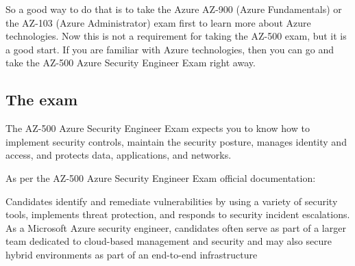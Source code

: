 So a good way to do that is to take the Azure AZ-900 (Azure Fundamentals) or the AZ-103 (Azure Administrator) exam first to learn more about Azure technologies. Now this is not a requirement for taking the AZ-500 exam, but it is a good start. If you are familiar with Azure technologies, then you can go and take the AZ-500 Azure Security Engineer Exam right away.

\subsection{The exam}
The AZ-500 Azure Security Engineer Exam expects you to know how to implement security controls, maintain the security posture, manages identity and access, and protects data, applications, and networks.

As per the AZ-500 Azure Security Engineer Exam official documentation:
\begin{formal}
Candidates identify and remediate vulnerabilities by using a variety of security tools, implements threat protection, and responds to security incident escalations. As a Microsoft Azure security engineer, candidates often serve as part of a larger team dedicated to cloud-based management and security and may also secure hybrid environments as part of an end-to-end infrastructure
\end{formal}